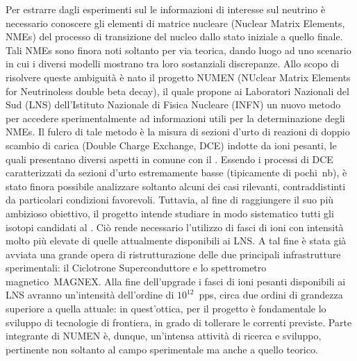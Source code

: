 Per estrarre dagli esperimenti sul \doppiobeta{} le informazioni di interesse sul neutrino è necessario conoscere gli elementi di matrice nucleare (Nuclear Matrix Elements, NMEs) del processo di transizione del nucleo dallo stato iniziale a quello finale. 
Tali NMEs sono finora noti soltanto per via teorica, dando luogo ad uno scenario in cui i diversi modelli mostrano tra loro sostanziali discrepanze.
Allo scopo di risolvere queste ambiguità è nato il progetto NUMEN (NUclear Matrix Elements for Neutrinoless double beta decay), il quale propone ai Laboratori Nazionali del Sud (LNS) dell'Istituto Nazionale di Fisica Nucleare (INFN) un nuovo metodo per accedere sperimentalmente ad informazioni utili per la determinazione degli NMEs.
Il fulcro di tale metodo è la misura di sezioni d'urto di reazioni di doppio scambio di carica (Double Charge Exchange, DCE) indotte da ioni pesanti, le quali presentano diversi aspetti in comune con il \doppiobeta.
Essendo i processi di DCE caratterizzati da sezioni d'urto estremamente basse (tipicamente di pochi~nb), è stato finora possibile analizzare soltanto alcuni dei casi rilevanti, contraddistinti da particolari condizioni favorevoli.
Tuttavia, al fine di raggiungere il suo più ambizioso obiettivo, il progetto intende studiare in modo sistematico tutti gli isotopi candidati al \doppiobeta{}.
Ciò rende necessario l'utilizzo di fasci di ioni con intensità molto più elevate di quelle attualmente disponibili ai LNS.
A tal fine è stata già avviata una grande opera di ristrutturazione delle due principali infrastrutture sperimentali: il Ciclotrone Superconduttore e lo spettrometro magnetico~MAGNEX.
Alla fine dell'upgrade i fasci di ioni pesanti disponibili ai LNS avranno un'intensità dell'ordine di $10^{12}$~pps, circa due ordini di grandezza superiore a quella attuale: in quest'ottica, per il progetto è fondamentale lo sviluppo di tecnologie di frontiera, in grado di tollerare le correnti previste.
Parte integrante di NUMEN è, dunque, un'intensa attività di ricerca e sviluppo, pertinente non soltanto al campo sperimentale ma anche a quello teorico.


